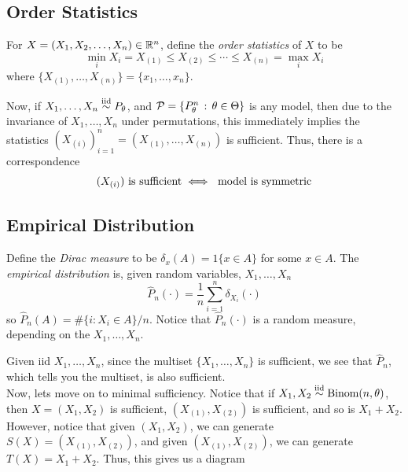 \subsection*{Order Statistics}
\sectionspace

\begin{definition}
    For $X = (X_1, X_2, \ldots, X_n) \in \R^n$, define the \emph{order statistics} of $X$ to be
    \[ \min_{i} X_i = X_{(1)} \leq X_{(2)} \leq \cdots \leq X_{(n)} = \max_{i} X_i \]
    where $\{X_{(1)}, \ldots, X_{(n)}\} = \{x_1, \ldots, x_n\}$. 
\end{definition}

Now, if $X_1, \ldots, X_n \iidsim P_{\theta}$, and $\cal{P} = \{P_{\theta}^{n} \col \theta \in \Theta\}$ is any model, then due to the invariance of $X_1, \ldots, X_n$ under permutations, this immediately implies the statistics $(X_{(i)})_{i = 1}^{n} = (X_{(1)}, \ldots, X_{(n)})$ is sufficient. Thus, there is a correspondence
\[ (X_{(i)}) \text{ is sufficient} \iff \tt{ model is symmetric} \]

\subsection*{Empirical Distribution}
\sectionspace

\begin{definition}
    Define the \emph{Dirac measure} to be $\delta_{x}(A) = 1\{x \in A\}$ for some $x \in A$. The \emph{empirical distribution} is, given random variables, $X_1, \ldots, X_n$
    \[ \hat{P}_{n}(\cdot) = \frac{1}{n}\sum_{i = 1}^{n} \delta_{X_{i}}(\cdot) \]
    so $\hat{P}_{n}(A) = \#\{i : X_{i} \in A\}/n$. Notice that $\hat{P}_{n}(\cdot)$ is a random measure, depending on the $X_1, \ldots, X_n$. 
\end{definition}
Given iid $X_1, \ldots, X_n$, since the multiset $\{X_1, \ldots, X_n\}$ is sufficient, we see that $\hat{P}_{n}$, which tells you the multiset, is also sufficient.\\

Now, lets move on to minimal sufficiency. Notice that if $X_1, X_2 \iidsim \Binom(n, \theta)$, then $X = (X_1, X_2)$ is sufficient, $(X_{(1)}, X_{(2)})$ is sufficient, and so is $X_1 + X_2$.\\

However, notice that given $(X_1, X_2)$, we can generate $S(X) = (X_{(1)}, X_{(2)})$, and given $(X_{(1)}, X_{(2)})$, we can generate $T(X) = X_1 + X_2$. Thus, this gives us a diagram

